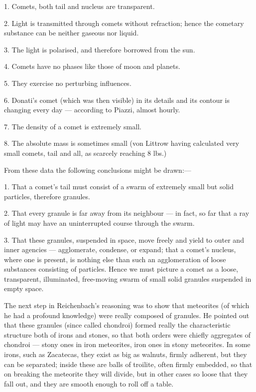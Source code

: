 \documentclass[a4paper, 12pt, oneside, polutonikogreek, english]{article}
\begin{document}
1. Comets, both tail and nucleus are transparent.

2. Light is transmitted through comets without refraction; hence the cometary substance can be neither gaseous nor liquid.

3. The light is polarised, and therefore borrowed from the sun.

4. Comets have no phases like those of moon and planets.

5. They exercise no perturbing influences.

6. Donati's comet (which was then visible) in its details and its contour is changing every day --- according to Piazzi, almost hourly.

7. The density of a comet is extremely small.

8. The absolute mass is sometimes small (von Littrow having calculated very small comets, tail and all, as scarcely reaching 8 lbs.)

From these data the following conclusions might be drawn:---

1. That a comet's tail must consist of a swarm of extremely small but solid particles, therefore granules.

2. That every granule is far away from its neighbour --- in fact, so far that a ray of light may have an uninterrupted course through the swarm.

3. That these granules, suspended in space, move freely and yield to outer and inner agencies --- agglomerate, condense, or expand; that a comet's nucleus, where one is present, is nothing else than such an agglomeration of loose substances consisting of particles. Hence we must picture a comet as a loose, transparent, illuminated, free-moving swarm of small solid granules suspended in empty space.

The next step in Reichenbach's reasoning was to show that meteorites (of which he had a profound knowledge) were really composed of granules. He pointed out that these granules (since called chondroi) formed really the characteristic structure both of irons and stones, so that both orders were chiefly aggregates of chondroi --- stony ones in iron meteorites, iron ones in stony meteorites. In some irons, such as Zacatecas, they exist as big as walnuts, firmly adherent, but they can be separated; inside these are balls of troilite, often firmly embedded, so that on breaking the meteorite they will divide, but in other cases so loose that they fall out, and they are smooth enough to roll off a table.
\end{document}
